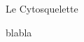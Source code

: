 \documentclass{beamer}
\title{}
\author{}
\date{}
\begin{document}
\begin{frame}{Le Cytosquelette}

blabla

\end{frame}
\end{document}
